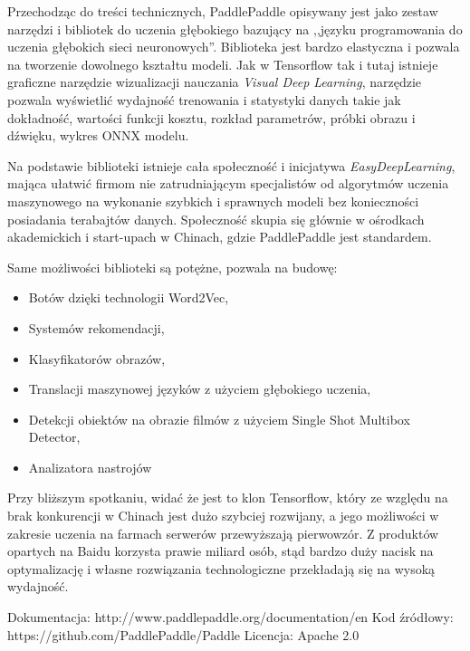\documentclass[12pt,a4paper,twoside,titlepage,openright]{book}
\begin{document}
Przechodząc do treści technicznych, PaddlePaddle opisywany jest jako zestaw narzędzi i bibliotek do uczenia głębokiego bazujący na ,,języku programowania do uczenia głębokich sieci neuronowych''. Biblioteka jest bardzo elastyczna i pozwala na tworzenie dowolnego kształtu modeli. Jak w Tensorflow tak i tutaj istnieje graficzne narzędzie wizualizacji nauczania \textit{Visual Deep Learning}, narzędzie pozwala wyświetlić wydajność trenowania i statystyki danych takie jak dokładność, wartości funkcji kosztu, rozkład parametrów, próbki obrazu i dźwięku, wykres ONNX modelu.

Na podstawie biblioteki istnieje cała społeczność i inicjatywa \textit{EasyDeepLearning}, mająca ułatwić firmom nie zatrudniającym specjalistów od algorytmów uczenia maszynowego na wykonanie szybkich i sprawnych modeli bez konieczności posiadania terabajtów danych. Społeczność skupia się głównie w ośrodkach akademickich i start-upach w Chinach, gdzie PaddlePaddle jest standardem.

Same możliwości biblioteki są potężne, pozwala na budowę:
\begin{itemize}
\item Botów dzięki technologii Word2Vec,
\item Systemów rekomendacji,
\item Klasyfikatorów obrazów,
\item Translacji maszynowej języków z użyciem głębokiego uczenia,
\item Detekcji obiektów na obrazie filmów z użyciem Single Shot Multibox Detector,
\item Analizatora nastrojów
\end{itemize}

Przy bliższym spotkaniu, widać że jest to klon Tensorflow, który ze względu na brak konkurencji w Chinach jest dużo szybciej rozwijany, a jego możliwości w zakresie uczenia na farmach serwerów przewyższają pierwowzór. Z produktów opartych na Baidu korzysta prawie miliard osób, stąd bardzo duży nacisk na optymalizację i własne rozwiązania technologiczne przekładają się na wysoką wydajność.

\noindent
\newline
Dokumentacja: http://www.paddlepaddle.org/documentation/en
\newline
Kod źródłowy: https://github.com/PaddlePaddle/Paddle
\newline
Licencja: Apache 2.0
\end{document}
